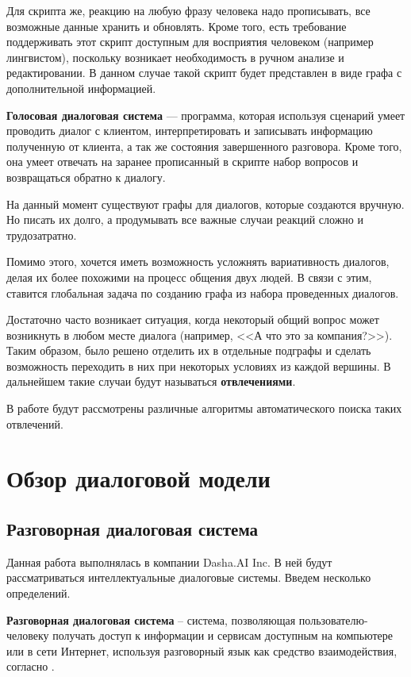 \documentclass[times,specification,annotation]{itmo-student-thesis}
\begin{document}
	Для скрипта же, реакцию на любую фразу человека надо прописывать, все возможные данные хранить и обновлять. Кроме того, есть требование поддерживать этот скрипт доступным для восприятия человеком (например лингвистом), поскольку возникает необходимость в ручном анализе и редактировании. В данном случае такой скрипт будет представлен в виде графа с дополнительной информацией.
	
	\textbf{Голосовая диалоговая система} — программа, которая используя сценарий умеет проводить диалог с клиентом, интерпретировать и записывать  информацию полученную от клиента, а так же состояния завершенного разговора. Кроме того, она умеет отвечать на заранее прописанный в скрипте набор вопросов и возвращаться обратно к диалогу.
	
	На данный момент существуют графы для диалогов, которые создаются вручную. Но писать их долго, а продумывать все важные случаи реакций сложно и трудозатратно. 
	
	Помимо этого, хочется иметь возможность усложнять вариативность диалогов, делая их более похожими на процесс общения двух людей. В связи с этим, ставится глобальная задача по созданию графа из набора проведенных диалогов. 
	
	Достаточно часто возникает ситуация, когда некоторый общий вопрос может возникнуть в любом месте диалога (например, <<А что это за компания?>>). Таким образом, было решено отделить их в отдельные подграфы и сделать возможность переходить в них при некоторых условиях из каждой вершины. В дальнейшем такие случаи будут называться \textbf{отвлечениями}.
	
	В работе будут рассмотрены различные алгоритмы автоматического поиска таких отвлечений.
	
	\chapter{Обзор диалоговой модели}
	\section{Разговорная диалоговая система}
	Данная работа выполнялась в компании Dasha.AI Inc. В ней будут рассматриваться интеллектуальные диалоговые системы. Введем несколько определений.
	
	\textbf{Разговорная диалоговая система} -- система, позволяющая пользователю-человеку получать доступ к информации и сервисам доступным на компьютере или в сети Интернет, используя разговорный язык как средство взаимодействия, согласно \cite{jokinen2010spoken}.
	
\end{document}
